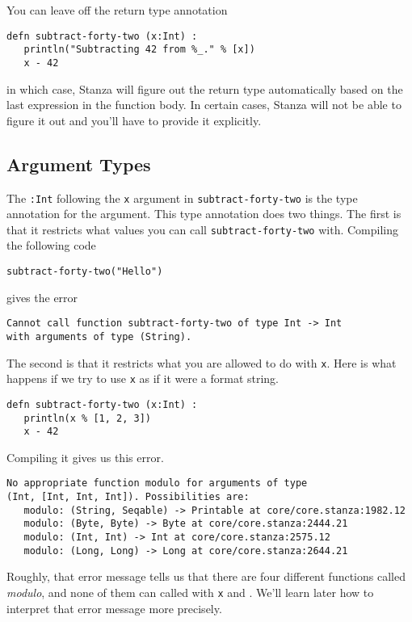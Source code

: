 \documentclass[10pt,oneside]{book}
\begin{document}
You can leave off the return type annotation
\begin{lstlisting}
defn subtract-forty-two (x:Int) :
   println("Subtracting 42 from %_." % [x])
   x - 42   
\end{lstlisting}
in which case, Stanza will figure out the return type automatically based on the last expression in the function body. In certain cases, Stanza will not be able to figure it out and you'll have to provide it explicitly.

\subsection*{Argument Types}
The \texttt{\frenchspacing :Int} following the \texttt{\frenchspacing x} argument in \texttt{\frenchspacing subtract-forty-two} is the type annotation for the argument. This type annotation does two things. The first is that it restricts what values you can call \texttt{\frenchspacing subtract-forty-two} with. Compiling the following code
\begin{lstlisting}
subtract-forty-two("Hello")
\end{lstlisting}
gives the error
\begin{lstlisting}
Cannot call function subtract-forty-two of type Int -> Int
with arguments of type (String).
\end{lstlisting}

The second is that it restricts what you are allowed to do with \texttt{\frenchspacing x}. Here is what happens if we try to use \texttt{\frenchspacing x} as if it were a format string.
\begin{lstlisting}
defn subtract-forty-two (x:Int) :
   println(x % [1, 2, 3])
   x - 42   
\end{lstlisting}
Compiling it gives us this error.
\begin{lstlisting}
No appropriate function modulo for arguments of type 
(Int, [Int, Int, Int]). Possibilities are:
   modulo: (String, Seqable) -> Printable at core/core.stanza:1982.12
   modulo: (Byte, Byte) -> Byte at core/core.stanza:2444.21
   modulo: (Int, Int) -> Int at core/core.stanza:2575.12
   modulo: (Long, Long) -> Long at core/core.stanza:2644.21
\end{lstlisting}

Roughly, that error message tells us that there are four different functions called {\em modulo}, and none of them can called with \texttt{\frenchspacing x} and \texttt{\frenchspacing [1, 2, 3]}. We'll learn later how to interpret that error message more precisely.
\end{document}
